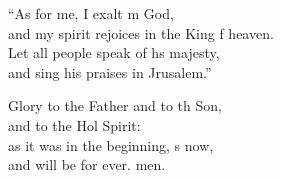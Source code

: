 \begin{psalmverse}
\begin{patverse}
    “As for me, I exalt m God,\Med\\
    and my spirit rejoices in the King f heaven.\\
    Let all people speak of h\pointup{\i}s majesty,\Med\\
    and sing his praises in Jrusalem.”

    Glory to the Father and to th Son,\Med\\
    and to the Hol Spirit:\\
    as it was in the beginning, \pointup{\i}s now,\Med\\
    and will be for ever. men.
  \end{patverse}
\end{psalmverse}
